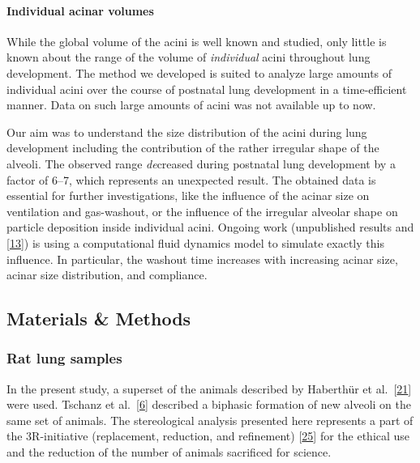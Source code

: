 \documentclass[
  american,
]{article}
\begin{document}
\hypertarget{individual-acinar-volumes}{%
\paragraph{Individual acinar volumes}\label{individual-acinar-volumes}}

While the global volume of the acini is well known and studied, only little is known about the range of the volume of \emph{individual} acini throughout lung development.
The method we developed is suited to analyze large amounts of individual acini over the course of postnatal lung development in a time-efficient manner.
Data on such large amounts of acini was not available up to now.

Our aim was to understand the size distribution of the acini during lung development including the contribution of the rather irregular shape of the alveoli.
The observed range \emph{de}creased during postnatal lung development by a factor of 6--7, which represents an unexpected result.
The obtained data is essential for further investigations, like the influence of the acinar size on ventilation and gas-washout, or the influence of the irregular alveolar shape on particle deposition inside individual acini.
Ongoing work (unpublished results and {[}\protect\hyperlink{ref-eb0gk6VO}{13}{]}) is using a computational fluid dynamics model to simulate exactly this influence.
In particular, the washout time increases with increasing acinar size, acinar size distribution, and compliance.

\hypertarget{materials-methods}{%
\subsection{Materials \& Methods}\label{materials-methods}}

\hypertarget{rat-lung-samples}{%
\subsubsection{Rat lung samples}\label{rat-lung-samples}}

In the present study, a superset of the animals described by Haberthür et al.~{[}\protect\hyperlink{ref-7YLeeyu}{21}{]} were used.
Tschanz et al.~{[}\protect\hyperlink{ref-wnl86DEM}{6}{]} described a biphasic formation of new alveoli on the same set of animals.
The stereological analysis presented here represents a part of the 3R-initiative (replacement, reduction, and refinement) {[}\protect\hyperlink{ref-199ALtdJt}{25}{]} for the ethical use and the reduction of the number of animals sacrificed for science.
\end{document}
